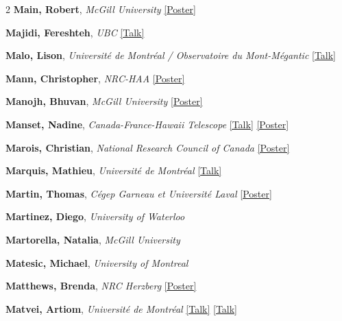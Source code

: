 \begin{small}
\begin{multicols}{2}
\textbf{Main, Robert}, {\footnotesize\textit{McGill University}} \hyperref[poster-abstract-page-talk-209]{\scriptsize\textcolor{cascateal}{[Poster]}}\par
\textbf{Majidi, Fereshteh}, {\footnotesize\textit{UBC}} \hyperref[abstract-page-talk-22]{\scriptsize\textcolor{cascablue}{[Talk]}}\par
\textbf{Malo, Lison}, {\footnotesize\textit{Université de Montréal / Observatoire du Mont-Mégantic}} \hyperref[abstract-page-talk-172]{\scriptsize\textcolor{cascablue}{[Talk]}}\par
\textbf{Mann, Christopher}, {\footnotesize\textit{NRC-HAA}} \hyperref[poster-abstract-page-talk-90]{\scriptsize\textcolor{cascateal}{[Poster]}}\par
\textbf{Manojh, Bhuvan}, {\footnotesize\textit{McGill University}} \hyperref[poster-abstract-page-talk-225]{\scriptsize\textcolor{cascateal}{[Poster]}}\par
\textbf{Manset, Nadine}, {\footnotesize\textit{Canada-France-Hawaii Telescope}} \hyperref[abstract-page-talk-157]{\scriptsize\textcolor{cascablue}{[Talk]}} \hyperref[poster-abstract-page-talk-155]{\scriptsize\textcolor{cascateal}{[Poster]}}\par
\textbf{Marois, Christian}, {\footnotesize\textit{National Research Council of Canada}} \hyperref[poster-abstract-page-talk-218]{\scriptsize\textcolor{cascateal}{[Poster]}}\par
\textbf{Marquis, Mathieu}, {\footnotesize\textit{Université de Montréal}} \hyperref[abstract-page-talk-273]{\scriptsize\textcolor{cascablue}{[Talk]}}\par
\textbf{Martin, Thomas}, {\footnotesize\textit{Cégep Garneau et Université Laval}} \hyperref[poster-abstract-page-talk-195]{\scriptsize\textcolor{cascateal}{[Poster]}}\par
\textbf{Martinez, Diego}, {\footnotesize\textit{University of Waterloo}}\par
\textbf{Martorella, Natalia}, {\footnotesize\textit{McGill University}}\par
\textbf{Matesic, Michael}, {\footnotesize\textit{University of Montreal}}\par
\textbf{Matthews, Brenda}, {\footnotesize\textit{NRC Herzberg}} \hyperref[poster-abstract-page-talk-17]{\scriptsize\textcolor{cascateal}{[Poster]}}\par
\textbf{Matvei, Artiom}, {\footnotesize\textit{Université de Montréal}} \hyperref[abstract-page-talk-335]{\scriptsize\textcolor{cascablue}{[Talk]}} \hyperref[abstract-page-talk-335]{\scriptsize\textcolor{cascablue}{[Talk]}}\par

\end{multicols}
\end{small}
